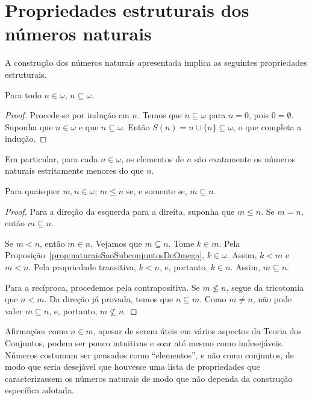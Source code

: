 \section{Propriedades estruturais dos números naturais}\label{sec:propriedadesEstruturaisDosNaturais}
A construção dos números naturais apresentada implica as seguintes propriedades estruturais.

\begin{proposition}[$Z^--P$]\label{prop:naturaisSaoSubconjuntosDeOmega}
    Para todo $n \in \omega$, $n\subseteq \omega$.
\end{proposition}

\begin{proof}
    Procede-se por indução em $n$.
    Temos que $n\subseteq \omega$ para $n=0$, pois $0=\emptyset$.
    Suponha que $n\in \omega$ e que $n\subseteq \omega$.
    Então $S(n)=n\cup\{n\}\subseteq \omega$, o que completa a indução.
\end{proof}

Em particular, para cada $n\in\omega$, os elementos de $n$ são exatamente os números naturais estritamente menores do que $n$.

\begin{corollary}[$Z^--P$]\label{cor:ordemPorInclusaoNosNaturais}
    Para quaisquer $m, n \in \omega$, $m\leq n$ se, e somente se, $m\subseteq n$.
\end{corollary}
\begin{proof}
    Para a direção da esquerda para a direita, suponha que $m\leq n$.
    Se $m=n$, então $m\subseteq n$.

    Se $m<n$, então $m\in n$.
    Vejamos que $m\subseteq n$.
    Tome $k\in m$.
    Pela Proposição~\ref{prop:naturaisSaoSubconjuntosDeOmega}, $k\in \omega$.
    Assim, $k<m$ e $m<n$.
    Pela propriedade transitiva, $k<n$, e, portanto, $k\in n$.
    Assim, $m\subseteq n$.

    Para a recíproca, procedemos pela contrapositiva.
    Se $m\not\leq n$, segue da tricotomia que $n<m$.
    Da direção já provada, temos que $n\subseteq m$.
    Como $m\neq n$, não pode valer $m\subseteq n$, e, portanto, $m\not\subseteq n$.
\end{proof}

Afirmações como $n \in m$, apesar de serem úteis em vários aspectos da Teoria dos Conjuntos, podem ser pouco intuitivas e soar até mesmo como indesejáveis.
Números costumam ser pensados como ``elementos'', e não como conjuntos, de modo que seria desejável que houvesse uma lista de propriedades que caracterizassem os números naturais de modo que não dependa da construção específica adotada.

